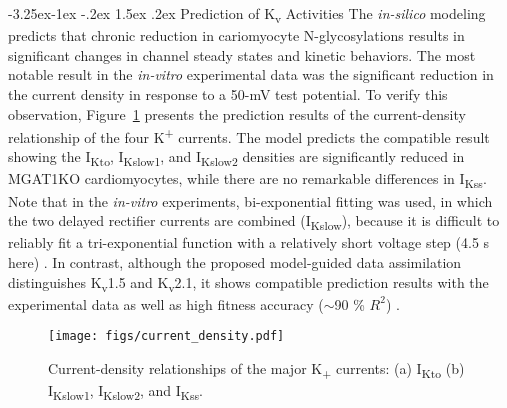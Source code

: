 \documentclass[11pt]{article}
\makeatletter
\renewcommand\subsection{\@startsection{subsection}{2}{\z@}%
                                     {-3.25ex\@plus -1ex \@minus -.2ex}%
                                     {1.5ex \@plus .2ex}%
                                     {\normalfont\fontfamily{phv}\fontsize{14}{17}\bfseries}}
\makeatother
\begin{document}
\subsection{Prediction of K\textsubscript{v} Activities}
The \textit{in-silico} modeling predicts that chronic reduction in cariomyocyte N-glycosylations results in significant changes in channel steady states and kinetic behaviors. The most notable result in the \textit{in-vitro} experimental data was the significant reduction in the current density in response to a 50-mV test potential. To verify this observation, Figure~\ref{fig:current_density} presents the prediction results of the current-density relationship of the four K\textsuperscript{+} currents. The model predicts the compatible result showing the I\textsubscript{Kto}, I\textsubscript{Kslow1}, and I\textsubscript{Kslow2} densities are significantly reduced in MGAT1KO cardiomyocytes, while there are no remarkable differences in I\textsubscript{Kss}. Note that in the \textit{in-vitro} experiments, bi-exponential fitting was used, in which the two delayed rectifier currents are combined (I\textsubscript{Kslow}), because it is difficult to reliably fit a tri-exponential function with a relatively short voltage step (4.5 s here) \citep{liu2011dissection}. In contrast, although the proposed model-guided data assimilation distinguishes K\textsubscript{v}1.5 and K\textsubscript{v}2.1, it shows compatible prediction results with the experimental data as well as high fitness accuracy ($\sim$90 \% $R^{2}$) \citep{ednie2019reduced}.
\begin{figure}[!ht]
    \centering
    \texttt{[image: figs/current\_density.pdf]}
    \caption{Current-density relationships of the major K\textsubscript{+} currents: (a) I\textsubscript{Kto} (b) I\textsubscript{Kslow1}, I\textsubscript{Kslow2}, and I\textsubscript{Kss}.}
    \label{fig:current_density}
\end{figure}
\end{document}
